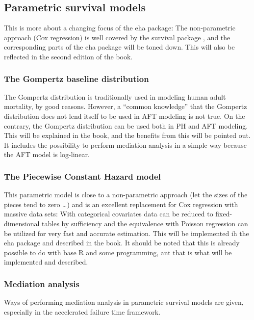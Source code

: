 \documentclass[a4paper,11pt]{article}
\begin{document}
\subsection{Parametric survival models}

This is more about a changing focus of the eha package: The non-parametric
approach (Cox regression) is well covered by the survival package
\citep{survival}, and the corresponding parts of the eha package will be
toned down. This will also be reflected in the second edition of the book. 

\subsubsection{The Gompertz baseline distribution}

The Gompertz distribution is traditionally used in modeling human adult
mortality, by good reasons. However, a ``common knowledge'' that the
Gompertz distribution does not lend itself to be used in AFT modeling is
not true. On the contrary, the Gompertz distribution can be used both in PH
and AFT modeling. This will be explained in the book, and the benefits from
this will be pointed out. It includes the possibility to perform mediation
analysis in a simple way because the AFT model is log-linear.


\subsubsection{The Piecewise Constant Hazard model}

This parametric model is close to a non-parametric approach (let the sizes
of the pieces tend to zero \ldots) and is an excellent replacement for Cox
regression with massive data sets: With categorical covariates data can be
reduced to fixed-dimensional tables by sufficiency and the equivalence
with Poisson regression can be utilized for very fast and accurate
estimation. This will be implemented ih the eha package and described in
the book. It should be noted that this is already possible to do with base R
and some programming, ant that is what will be implemented and described.   

\subsubsection{Mediation analysis}

Ways of performing mediation analysis in parametric survival models are
given, especially in the accelerated failure time framework.
\end{document}
